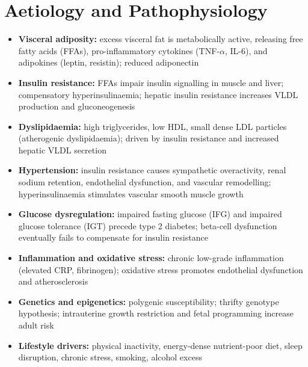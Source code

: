 \section*{Aetiology and Pathophysiology}
\begin{itemize}
    \item \textbf{Visceral adiposity:} excess visceral fat is metabolically active, releasing free fatty acids (FFAs), pro-inflammatory cytokines (TNF-$\alpha$, IL-6), and adipokines (leptin, resistin); reduced adiponectin
    \item \textbf{Insulin resistance:} FFAs impair insulin signalling in muscle and liver; compensatory hyperinsulinaemia; hepatic insulin resistance increases VLDL production and gluconeogenesis
    \item \textbf{Dyslipidaemia:} high triglycerides, low HDL, small dense LDL particles (atherogenic dyslipidaemia); driven by insulin resistance and increased hepatic VLDL secretion
    \item \textbf{Hypertension:} insulin resistance causes sympathetic overactivity, renal sodium retention, endothelial dysfunction, and vascular remodelling; hyperinsulinaemia stimulates vascular smooth muscle growth
    \item \textbf{Glucose dysregulation:} impaired fasting glucose (IFG) and impaired glucose tolerance (IGT) precede type 2 diabetes; beta-cell dysfunction eventually fails to compensate for insulin resistance
    \item \textbf{Inflammation and oxidative stress:} chronic low-grade inflammation (elevated CRP, fibrinogen); oxidative stress promotes endothelial dysfunction and atherosclerosis
    \item \textbf{Genetics and epigenetics:} polygenic susceptibility; thrifty genotype hypothesis; intrauterine growth restriction and fetal programming increase adult risk
    \item \textbf{Lifestyle drivers:} physical inactivity, energy-dense nutrient-poor diet, sleep disruption, chronic stress, smoking, alcohol excess
\end{itemize}

